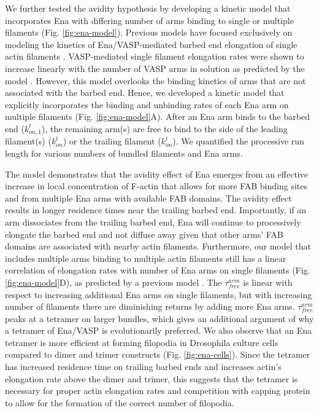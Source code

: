 We further tested the avidity hypothesis by developing a kinetic model that incorporates Ena with differing number of arms binding to single or multiple filaments (Fig. \ref{fig:ena-model}). Previous models have focused exclusively on modeling the kinetics of Ena/VASP-mediated barbed end elongation of single actin filaments \citep{hansen_vasp_2010, breitsprecher_molecular_2011, bruhmann_distinct_2017}. VASP-mediated single filament elongation rates were shown to increase linearly with the number of VASP arms in solution as predicted by the model \citep{breitsprecher_molecular_2011}. However, this model overlooks the binding kinetics of arms that are not associated with the barbed end. Hence, we developed a kinetic model that explicitly incorporates the binding and unbinding rates of each Ena arm on multiple filaments (Fig. \ref{fig:ena-model}A). After an Ena arm binds to the barbed end ($k_{on,1}^{t}$), the remaining arm(s) are free to bind to the side of the leading filament(s) ($k_{on}^{l}$) or the trailing filament ($k_{on}^{t}$). We quantified the processive run length for various numbers of bundled filaments and Ena arms. 

The model demonstrates that the avidity effect of Ena emerges from an effective increase in local concentration of F-actin that allows for more FAB binding sites and from multiple Ena arms with available FAB domains. The avidity effect results in longer residence times near the trailing barbed end. Importantly, if an arm dissociates from the trailing barbed end, Ena will continue to processively elongate the barbed end and not diffuse away given that other arms' FAB domains are associated with nearby actin filaments. Furthermore, our model that includes multiple arms binding to multiple actin filaments still has a linear correlation of elongation rates with number of Ena arms on single filaments (Fig. \ref{fig:ena-model}D), as predicted by a previous model \citep{bruhmann_distinct_2017}. The $\tau_{free}^{arm}$ is linear with respect to increasing additional Ena arms on single filaments, but with increasing number of filaments there are diminishing returns by adding more Ena arms. $\tau_{free}^{arm}$ peaks at a tetramer on larger bundles, which gives an additional argument of why a tetramer of Ena/VASP is evolutionarily preferred. We also observe that an Ena tetramer is more efficient at forming filopodia in Drosophila culture cells compared to dimer and trimer constructs (Fig. \ref{fig:ena-cells}). Since the tetramer has increased residence time on trailing barbed ends and increases actin's elongation rate above the dimer and trimer, this suggests that the tetramer is necessary for proper actin elongation rates and competition with capping protein to allow for the formation of the correct number of filopodia. 
% 
% 
% 


